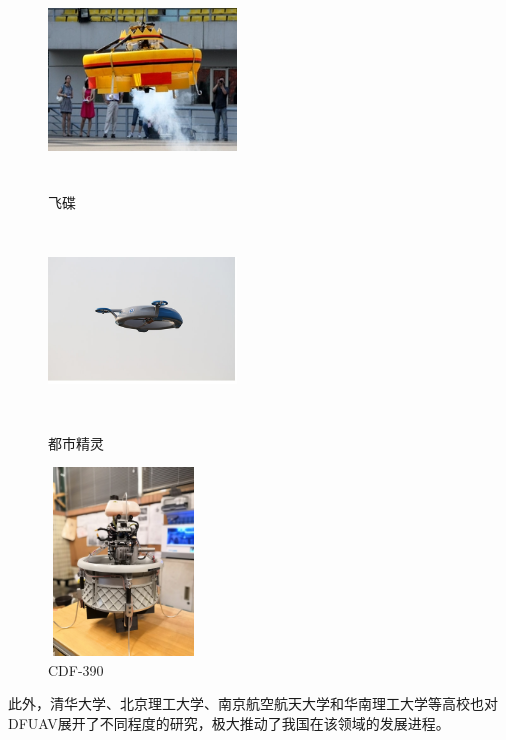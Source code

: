 \begin{figure}[htbp]
	\centering
	\begin{minipage}[c]{0.33\textwidth} %
		\centering
		\includegraphics[width=5cm,height=5cm]{Fig/飞碟.jpg}
		\caption{\label{飞碟}飞碟}
	\end{minipage}%
	\begin{minipage}[c]{0.33\textwidth}
		\centering
		\includegraphics[width=5cm,height=5cm]{Fig/都市精灵.jpg}
		\caption{\label{都市精灵}都市精灵}
	\end{minipage}
    \begin{minipage}[c]{0.33\textwidth}
		\centering
		\includegraphics[width=4cm,height=5cm]{Fig/CDF-390.jpg}
		\caption{\label{CDF-390}CDF-390}
	\end{minipage}
\end{figure}

此外，清华大学\cite{chouStudyOverallDesign2021,luoNumericalAnalysisWind2024a}、北京理工大学\cite{manzoorCompoundLearningBasedModel2024}、南京航空航天大学\cite{caiNumericalPredictionUnsteady2022}和华南理工大学\cite{yinDuctedFanUAV2024,1022766347.nh}等高校也对DFUAV展开了不同程度的研究，极大推动了我国在该领域的发展进程。


